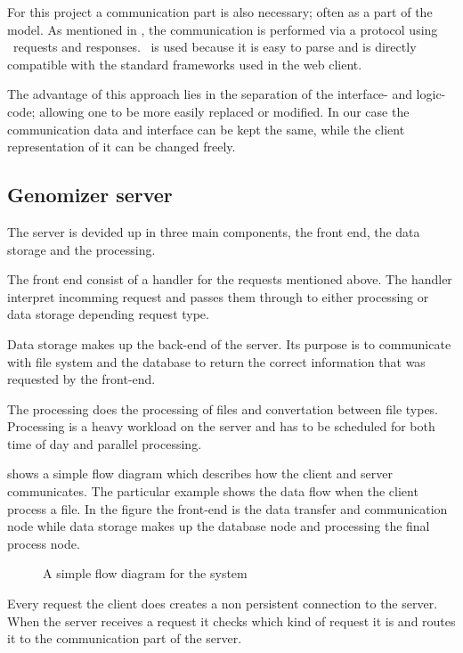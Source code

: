  For this project a communication part is also necessary; often as a part of the model. As mentioned in , the communication is performed via a  protocol using \json\ requests and responses. \json\ is used because it is easy to parse and is directly compatible with the standard frameworks used in the web client.
 
 The advantage of this approach lies in the separation of the interface- and logic-code; allowing one to be more easily replaced or modified. In our case the communication data and interface can be kept the same, while the client representation of it can be changed freely.
 

\subsection{Genomizer server}
The server is devided up in three main components, the front end, the data storage and the processing.

The front end consist of a handler for the  requests mentioned above. The handler interpret incomming request and passes them through to either processing or data storage depending request type.

Data storage makes up the back-end of the server. Its purpose is to communicate with file system and the database to return the correct information that was requested by the front-end.

The processing does the processing of files and convertation between file types. Processing is a heavy workload on the server and has to be scheduled for both time of day and  parallel processing.

 shows a simple flow diagram which describes how the client and server
 communicates. The particular example shows the data flow when the client process a file.
 In the figure the front-end is the data transfer and communication node while data storage makes up the database node and processing the final process node.

\begin{figure}[htb]
\caption{A simple flow diagram for the system}
\label{fig:com_systemoverview}
\end{figure}

Every request the client does creates a non persistent connection to
the server. When the server receives a request it checks which kind of
request it is and routes it to the communication part of the server.

